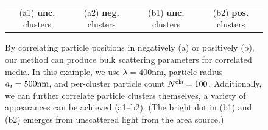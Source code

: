 \begin{figure}
\begin{tabular}{cc|cc}
        \\
        (a1) \textbf{unc.} clusters & (a2) \textbf{neg.} clusters & (b1) \textbf{unc.} clusters & (b2) \textbf{pos.} clusters
    \end{tabular}
    \caption{\label{fig:correlated}
        By correlating particle positions in negatively (a) or positively (b), our method can produce bulk scattering parameters for correlated media.
        In this example, we use $\lambda = 400\text{nm}$, particle radius~$a_i = 500\text{nm}$, and per-cluster particle count ${N^\text{cls}} = 100$.
        Additionally, we can further correlate particle clusters themselves, a variety of appearances can be achieved (a1--b2).
        (The bright dot in (b1) and (b2) emerges from unscattered light from the area source.)
    }
\end{figure}

